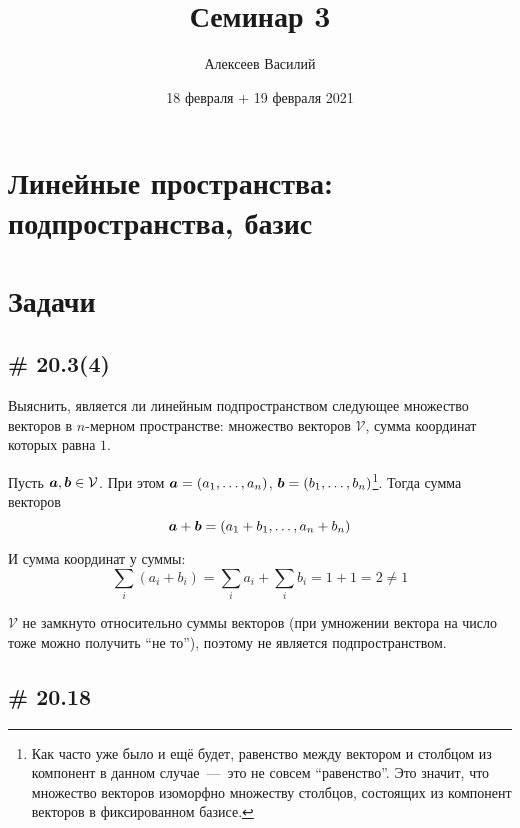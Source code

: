 \documentclass[a4paper,12pt]{article}
\author{Алексеев Василий}
\title{Семинар 3}
\date{18 февраля + 19 февраля 2021}
\begin{document}
  \maketitle
  
  \tableofcontents

  \thispagestyle{empty}
  
  \newpage
  


  \section{Линейные пространства: подпространства, базис}
  
  \section{Задачи}
  
  
  \subsection{\# 20.3(4)}
  
  Выяснить, является ли линейным подпространством следующее множество векторов в $n$-мерном пространстве:
  множество векторов $\mathcal V$, сумма координат которых равна $1$.
  
  \begin{solution}
    Пусть $\boldsymbol a, \boldsymbol b \in \mathcal V$.
    При этом $\bds a \hm= (a_1, \ldots, a_n)$, $\bds b \hm= (b_1, \ldots, b_n)$\footnote{Как часто уже было и ещё будет, равенство между вектором и столбцом из компонент в данном случае~---~это не совсем ``равенство''. Это значит, что множество векторов изоморфно множеству столбцов, состоящих из компонент векторов в фиксированном базисе.}.
    Тогда сумма векторов
    \[
      \boldsymbol a + \boldsymbol b = (a_1 + b_1, \ldots, a_n + b_n)
    \]
    
    И сумма координат у суммы:
    \[
      \sum_i (a_i + b_i) = \sum_i a_i + \sum_i b_i = 1 + 1 = 2 \not= 1
    \]
    
    $\mathcal V$ не замкнуто относительно суммы векторов (при умножении вектора на число тоже можно получить ``не то''), поэтому не является подпространством.
  \end{solution}
  
  
  \subsection{\# 20.18}
  
\end{document}

